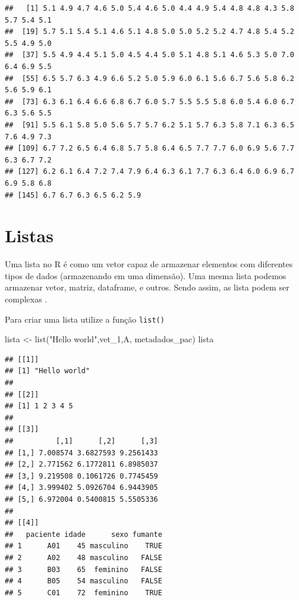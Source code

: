 \documentclass[
]{book}
\newenvironment{Shaded}{\begin{snugshade}}{\end{snugshade}}
\newcommand{\CommentTok}[1]{\textcolor[rgb]{0.56,0.35,0.01}{\textit{#1}}}
\newcommand{\FunctionTok}[1]{\textcolor[rgb]{0.00,0.00,0.00}{#1}}
\newcommand{\NormalTok}[1]{#1}
\newcommand{\OtherTok}[1]{\textcolor[rgb]{0.56,0.35,0.01}{#1}}
\newcommand{\SpecialCharTok}[1]{\textcolor[rgb]{0.00,0.00,0.00}{#1}}
\newcommand{\StringTok}[1]{\textcolor[rgb]{0.31,0.60,0.02}{#1}}
\begin{document}
\begin{Shaded}
\end{Shaded}

\begin{verbatim}
##   [1] 5.1 4.9 4.7 4.6 5.0 5.4 4.6 5.0 4.4 4.9 5.4 4.8 4.8 4.3 5.8 5.7 5.4 5.1
##  [19] 5.7 5.1 5.4 5.1 4.6 5.1 4.8 5.0 5.0 5.2 5.2 4.7 4.8 5.4 5.2 5.5 4.9 5.0
##  [37] 5.5 4.9 4.4 5.1 5.0 4.5 4.4 5.0 5.1 4.8 5.1 4.6 5.3 5.0 7.0 6.4 6.9 5.5
##  [55] 6.5 5.7 6.3 4.9 6.6 5.2 5.0 5.9 6.0 6.1 5.6 6.7 5.6 5.8 6.2 5.6 5.9 6.1
##  [73] 6.3 6.1 6.4 6.6 6.8 6.7 6.0 5.7 5.5 5.5 5.8 6.0 5.4 6.0 6.7 6.3 5.6 5.5
##  [91] 5.5 6.1 5.8 5.0 5.6 5.7 5.7 6.2 5.1 5.7 6.3 5.8 7.1 6.3 6.5 7.6 4.9 7.3
## [109] 6.7 7.2 6.5 6.4 6.8 5.7 5.8 6.4 6.5 7.7 7.7 6.0 6.9 5.6 7.7 6.3 6.7 7.2
## [127] 6.2 6.1 6.4 7.2 7.4 7.9 6.4 6.3 6.1 7.7 6.3 6.4 6.0 6.9 6.7 6.9 5.8 6.8
## [145] 6.7 6.7 6.3 6.5 6.2 5.9
\end{verbatim}

\hypertarget{listas}{%
\section{Listas}\label{listas}}

Uma lista no R é como um vetor capaz de armazenar elementos com diferentes tipos de dados (armazenando em uma dimensão). Uma mesma lista podemos armazenar vetor, matriz, dataframe, e outros. Sendo assim, as lista podem ser complexas .

Para criar uma lista utilize a função \texttt{list()}

\begin{Shaded}
\begin{Highlighting}[]
\NormalTok{lista }\OtherTok{\textless{}{-}} \FunctionTok{list}\NormalTok{(}\StringTok{"Hello world"}\NormalTok{,vet\_1,A, metadados\_pac) }
\NormalTok{lista}
\end{Highlighting}
\end{Shaded}

\begin{verbatim}
## [[1]]
## [1] "Hello world"
## 
## [[2]]
## [1] 1 2 3 4 5
## 
## [[3]]
##          [,1]      [,2]      [,3]
## [1,] 7.008574 3.6827593 9.2561433
## [2,] 2.771562 6.1772811 6.8985037
## [3,] 9.219508 0.1061726 0.7745459
## [4,] 3.999402 5.0926704 6.9443905
## [5,] 6.972004 0.5400815 5.5505336
## 
## [[4]]
##   paciente idade      sexo fumante
## 1      A01    45 masculino    TRUE
## 2      A02    48 masculino   FALSE
## 3      B03    65  feminino   FALSE
## 4      B05    54 masculino   FALSE
## 5      C01    72  feminino    TRUE
\end{verbatim}
\end{document}
